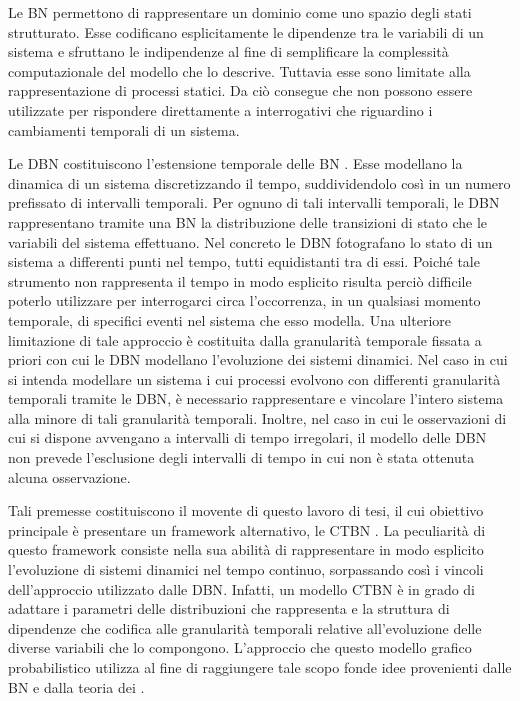 Le \acf{BN}
\citep{Pearl1988}
permettono di rappresentare un dominio come uno spazio degli stati strutturato.
Esse codificano esplicitamente le dipendenze tra le variabili di un sistema e sfruttano le indipendenze al fine di semplificare la complessità computazionale del modello che lo descrive.
Tuttavia esse sono limitate alla rappresentazione di processi statici.
Da ciò consegue che non possono essere utilizzate per rispondere direttamente a interrogativi che riguardino i cambiamenti temporali di un sistema.

Le \acf{DBN} costituiscono l'estensione temporale delle \acl{BN}
\citep{Dean1989}
. Esse modellano la dinamica di un sistema discretizzando il tempo, suddividendolo così in un numero prefissato di intervalli temporali.
Per ognuno di tali intervalli temporali, le \acl{DBN} rappresentano tramite una \acl{BN} la distribuzione delle transizioni di stato che le variabili del sistema effettuano.
Nel concreto le \acf{DBN} fotografano lo stato di un sistema a differenti punti nel tempo, tutti equidistanti tra di essi.
Poiché tale strumento non rappresenta il tempo in modo esplicito risulta perciò difficile poterlo utilizzare per interrogarci circa l'occorrenza, in un qualsiasi momento temporale, di specifici eventi nel sistema che esso modella.
Una ulteriore limitazione di tale approccio è costituita dalla granularità temporale fissata a priori con cui le \acl{DBN} modellano l'evoluzione dei sistemi dinamici.
Nel caso in cui si intenda modellare un sistema i cui processi evolvono con differenti granularità temporali tramite le \acl{DBN}, è necessario rappresentare e vincolare l'intero sistema alla minore di tali granularità temporali.
Inoltre, nel caso in cui le osservazioni di cui si dispone avvengano a intervalli di tempo irregolari, il modello delle \acl{DBN} non prevede l'esclusione degli intervalli di tempo in cui non è stata ottenuta alcuna osservazione.

Tali premesse costituiscono il movente di questo lavoro di tesi, il cui obiettivo principale è presentare un framework alternativo, le \acf{CTBN}
\citep{Nodelman2007}
. La peculiarità di questo framework consiste nella sua abilità di rappresentare in modo esplicito l'evoluzione di sistemi dinamici nel tempo continuo, sorpassando così i vincoli dell'approccio utilizzato dalle \acl{DBN}.
Infatti, un modello \acl{CTBN} è in grado di adattare i parametri delle distribuzioni che rappresenta e la struttura di dipendenze che codifica alle granularità temporali relative all'evoluzione delle diverse variabili che lo compongono.
L'approccio che questo modello grafico probabilistico utilizza al fine di raggiungere tale scopo fonde idee provenienti dalle \acl{BN} e dalla teoria dei \mprocess{}.

